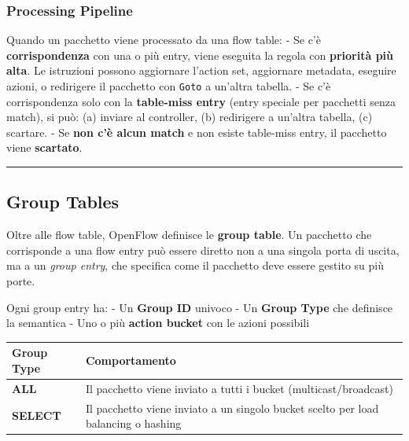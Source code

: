 \documentclass[
  italian,
  openany]{book}
\newcounter{none} %
\begin{document}
\subsubsection{Processing Pipeline}\label{processing-pipeline}

Quando un pacchetto viene processato da una flow table: - Se c'è
\textbf{corrispondenza} con una o più entry, viene eseguita la regola
con \textbf{priorità più alta}. Le istruzioni possono aggiornare
l'action set, aggiornare metadata, eseguire azioni, o redirigere il
pacchetto con \texttt{Goto} a un'altra tabella. - Se c'è corrispondenza
solo con la \textbf{table-miss entry} (entry speciale per pacchetti
senza match), si può: (a) inviare al controller, (b) redirigere a
un'altra tabella, (c) scartare. - Se \textbf{non c'è alcun match} e non
esiste table-miss entry, il pacchetto viene \textbf{scartato}.

\begin{center}\rule{0.5\linewidth}{0.5pt}\end{center}

\subsection{Group Tables}\label{group-tables}

Oltre alle flow table, OpenFlow definisce le \textbf{group table}. Un
pacchetto che corrisponde a una flow entry può essere diretto non a una
singola porta di uscita, ma a un \emph{group entry}, che specifica come
il pacchetto deve essere gestito su più porte.

Ogni group entry ha: - Un \textbf{Group ID} univoco - Un \textbf{Group
Type} che definisce la semantica - Uno o più \textbf{action bucket} con
le azioni possibili

{\def\LTcaptype{none} %
\begin{longtable}[]{@{}
  >{\raggedright\arraybackslash}p{}
  >{\raggedright\arraybackslash}p{}@{}}
\toprule\noalign{}
\begin{minipage}[b]{\linewidth}\raggedright
Group Type
\end{minipage} & \begin{minipage}[b]{\linewidth}\raggedright
Comportamento
\end{minipage} \\
\midrule\noalign{}
\endhead
\bottomrule\noalign{}
\endlastfoot
\textbf{ALL} & Il pacchetto viene inviato a tutti i bucket
(multicast/broadcast) \\
\textbf{SELECT} & Il pacchetto viene inviato a un singolo bucket scelto
per load balancing o hashing \\
\end{longtable}
}
\end{document}
